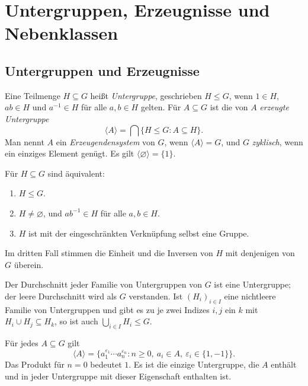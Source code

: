 \chapter{Untergruppen, Erzeugnisse und Nebenklassen}

\section{Untergruppen und Erzeugnisse}

\begin{definition}
Eine Teilmenge \(H\subseteq G\) heißt \emph{Untergruppe}, geschrieben
\(H\leq G\), wenn \(1\in H\), \(ab\in H\) und \(a^{-1}\in H\)
für alle \(a,b\in H\) gelten.
Für \(A\subseteq G\) ist die von \(A\) \emph{erzeugte Untergruppe}
\[
 \langle A\rangle=\bigcap\{H\leq G:A\subseteq H\}.
\]
Man nennt \(A\) ein \emph{Erzeugendensystem} von \(G\), wenn
\(\langle A\rangle=G\), und \(G\) \emph{zyklisch}, wenn ein einziges
Element genügt. Es gilt \(\langle\varnothing\rangle=\{1\}\).
\end{definition}

\begin{theorem}[Untergruppenkriterium]
Für \(H\subseteq G\) sind äquivalent:
\begin{enumerate}
\item \(H\leq G\).
\item \(H\ne\varnothing\), und \(ab^{-1}\in H\) für alle \(a,b\in H\).
\item \(H\) ist mit der eingeschränkten Verknüpfung selbst eine Gruppe.
\end{enumerate}
Im dritten Fall stimmen die Einheit und die Inversen von \(H\)
mit denjenigen von \(G\) überein. \cite{milne}
\end{theorem}

\begin{theorem}
Der Durchschnitt jeder Familie von Untergruppen von \(G\) ist eine
Untergruppe; der leere Durchschnitt wird als \(G\) verstanden.
Ist \((H_i)_{i\in I}\) eine nichtleere Familie von Untergruppen und
gibt es zu je zwei Indizes \(i,j\) ein \(k\) mit
\(H_i\cup H_j\subseteq H_k\), so ist auch \(\bigcup_{i\in I}H_i\leq G\).
\cite{milne}
\end{theorem}

\begin{theorem}
Für jedes \(A\subseteq G\) gilt
\[
 \langle A\rangle
 =\{a_1^{\varepsilon_1}\cdots a_n^{\varepsilon_n}:
 n\geq0,\ a_i\in A,\ \varepsilon_i\in\{1,-1\}\}.
\]
Das Produkt für \(n=0\) bedeutet \(1\).
Es ist die einzige Untergruppe, die \(A\) enthält und in jeder
Untergruppe mit dieser Eigenschaft enthalten ist. \cite{milne}
\end{theorem}

